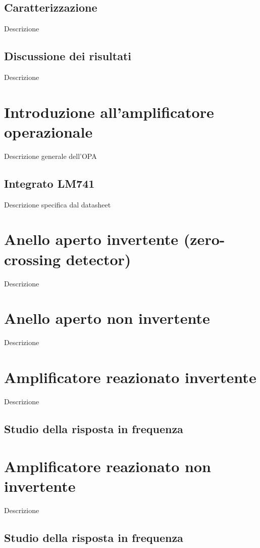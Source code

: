 \documentclass[journal]{IEEEtran}
\begin{document}
\subsection{\textbf{Caratterizzazione}}
Descrizione

\subsection{\textbf{Discussione dei risultati}}
Descrizione

\section{\textbf{Introduzione all'amplificatore operazionale}}
Descrizione generale dell'OPA

\subsection{\textbf{Integrato LM741}}
Descrizione specifica dal datasheet

\section{\textbf{Anello aperto invertente (zero-crossing detector)}}
Descrizione

\section{\textbf{Anello aperto non invertente}}
Descrizione

\section{\textbf{Amplificatore reazionato invertente}}
Descrizione

\subsection{Studio della risposta in frequenza}

\section{\textbf{Amplificatore reazionato non invertente}}
Descrizione

\subsection{Studio della risposta in frequenza}
\end{document}
